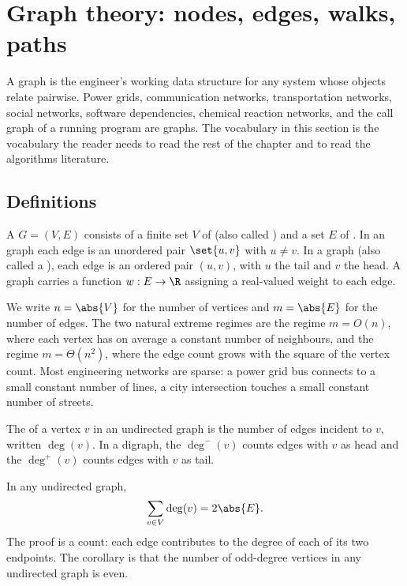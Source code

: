 \section{Graph theory: nodes, edges, walks, paths}

A graph is the engineer's working data structure for any system
whose objects relate pairwise. Power grids, communication networks,
transportation networks, social networks, software dependencies,
chemical reaction networks, and the call graph of a running program
are graphs. The vocabulary in this section is the vocabulary the
reader needs to read the rest of the chapter and to read the
algorithms literature.

\subsection{Definitions}

\begin{definition}[Graph]
A  $G = (V, E)$ consists of a finite set $V$ of
 (also called ) and a set $E$ of
. In an  graph each edge is an
unordered pair $\set{u, v}$ with $u \neq v$. In a 
graph (also called a ), each edge is an ordered
pair $(u, v)$, with $u$ the tail and $v$ the head. A
 graph carries a function $w: E \to \R$ assigning
a real-valued weight to each edge.
\end{definition}

We write $n = \abs{V}$ for the number of vertices and $m = \abs{E}$
for the number of edges. The two natural extreme regimes are the
 regime $m = O(n)$, where each vertex has on
average a constant number of neighbours, and the 
regime $m = \Theta(n^{2})$, where the edge count grows with the
square of the vertex count. Most engineering networks are sparse:
a power grid bus connects to a small constant number of lines, a
city intersection touches a small constant number of streets.

The  of a vertex $v$ in an undirected graph is the
number of edges incident to $v$, written $\deg(v)$. In a digraph,
the  $\deg^{-}(v)$ counts edges with $v$ as head
and the  $\deg^{+}(v)$ counts edges with $v$ as
tail.

\begin{principle}
In any undirected graph,
\[
\sum_{v \in V} \deg(v) = 2 \abs{E}.
\]
The proof is a count: each edge contributes to the degree of each
of its two endpoints. The corollary is that the number of
odd-degree vertices in any undirected graph is even.
\end{principle}

